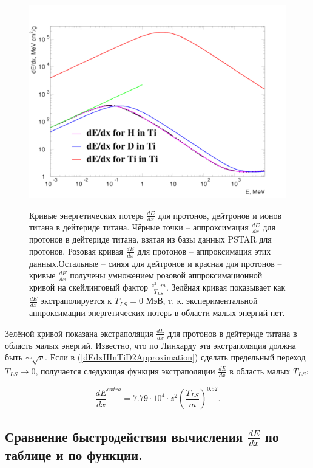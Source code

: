\documentclass[a4paper,12pt]{article}
\begin{document}
\begin{large}
\begin{figure}[ht]
  {
     \includegraphics[width=0.99\linewidth]{images/dedx.pdf}
  }
  \caption{Кривые энергетических потерь $\frac{dE}{dx}$ для протонов, дейтронов и ионов титана в дейтериде титана. Чёрные точки -- аппроксимация $\frac{dE}{dx}$ для протонов в дейтериде титана, взятая из базы данных PSTAR для протонов. Розовая кривая $\frac{dE}{dx}$ для протонов -- аппроксимация этих данных.Остальные -- синяя для дейтронов и красная для протонов -- кривые $\frac{dE}{dx}$ получены умножением розовой аппроксимационной кривой на скейлинговый фактор $\frac{z^2 \cdot m}{T_{LS}}$. Зелёная кривая показывает как $\frac{dE}{dx}$ экстраполируется к $T_{LS}=0$ МэВ, т. к. экспериментальной аппроксимации энергетических потерь в области малых энергий нет.}
  \label{fig:DeDxInTiD2Plot}
\end{figure}

	Зелёной кривой показана экстраполяция $\frac{dE}{dx}$ для протонов в дейтериде титана в область малых энергий.
	Известно, что по Линхарду эта экстраполяция должна быть $\sim \sqrt{v}$.
	Если в (\ref{dEdxHInTiD2Approximation}) сделать предельный переход $T_{LS} \to 0$, получается следующая функция экстраполяции $\frac{dE}{dx}$ в область малых $T_{LS}$:

\begin{equation}
  \label{dEdxLinhardExtrapolationInSmallTls}	
  \frac{dE}{dx}^{extra}=7.79 \cdot 10^4  \cdot z^2 \left( \frac{T_{LS}}{m} \right)^{0.52}.
\end{equation}

\subsection{Сравнение быстродействия вычисления $\frac{dE}{dx}$ по таблице и по функции.}
\label{ValdEdx2}	


\end{large}
\end{document}
